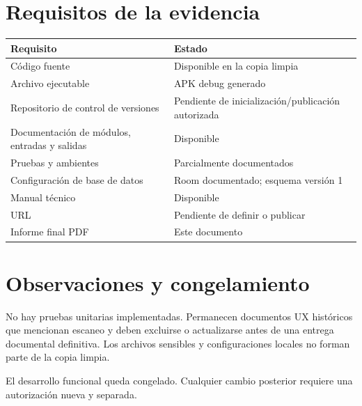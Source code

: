 \documentclass[11pt,a4paper]{article}
\begin{document}
\section{Requisitos de la evidencia}
\begin{longtable}{p{8.5cm}p{4.8cm}}
\toprule
\textbf{Requisito} & \textbf{Estado}\\
\midrule
Código fuente & Disponible en la copia limpia\\
Archivo ejecutable & APK debug generado\\
Repositorio de control de versiones & Pendiente de inicialización/publicación autorizada\\
Documentación de módulos, entradas y salidas & Disponible\\
Pruebas y ambientes & Parcialmente documentados\\
Configuración de base de datos & Room documentado; esquema versión 1\\
Manual técnico & Disponible\\
URL & Pendiente de definir o publicar\\
Informe final PDF & Este documento\\
\bottomrule
\end{longtable}

\section{Observaciones y congelamiento}
No hay pruebas unitarias implementadas. Permanecen documentos UX históricos que mencionan escaneo y deben excluirse o actualizarse antes de una entrega documental definitiva. Los archivos sensibles y configuraciones locales no forman parte de la copia limpia.

El desarrollo funcional queda congelado. Cualquier cambio posterior requiere una autorización nueva y separada.
\end{document}
